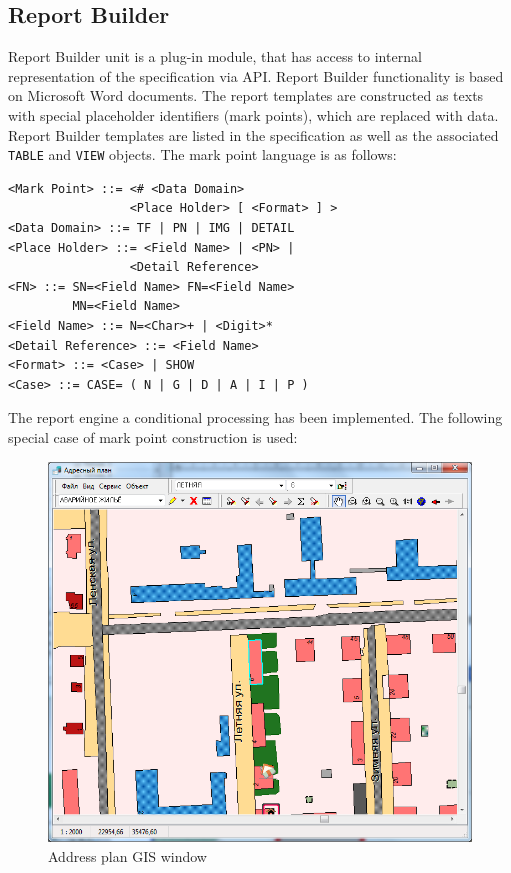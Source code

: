 \documentclass[conference]{IEEEtran}
\begin{document}
\subsection{Report Builder}
\label{sec:report-builder}

Report Builder unit is a plug-in module, that has access to internal representation of the specification via API.  Report Builder functionality is based on Microsoft Word documents.  The report templates are constructed as texts with special placeholder identifiers (mark points), which are replaced with data.  Report Builder templates are listed in the specification as well as the associated \texttt{TABLE} and \texttt{VIEW} objects.  The mark point language is as follows:

\begin{lstlisting}
<Mark Point> ::= <# <Data Domain>
                 <Place Holder> [ <Format> ] >
<Data Domain> ::= TF | PN | IMG | DETAIL
<Place Holder> ::= <Field Name> | <PN> |
                 <Detail Reference>
<FN> ::= SN=<Field Name> FN=<Field Name>
         MN=<Field Name>
<Field Name> ::= N=<Char>+ | <Digit>*
<Detail Reference> ::= <Field Name>
<Format> ::= <Case> | SHOW
<Case> ::= CASE= ( N | G | D | A | I | P )
\end{lstlisting}

The report engine a conditional processing has been implemented.  The following special case of mark point construction is used:

\begin{figure}[b]
  \centering
  \includegraphics[width=0.9\linewidth]{addressplan.png}
  \caption{Address plan GIS window}
  \label{fig:addrplan}
\end{figure}
\end{document}
